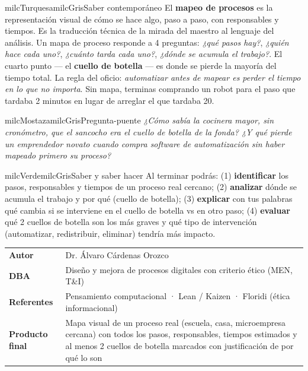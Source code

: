 \documentclass[11pt,letterpaper]{article}
\begin{document}
\begin{softbox}{milcTurquesa}{milcGris}{Saber contemporáneo}
El \textbf{mapeo de procesos} es la representación visual de cómo se hace algo, paso a paso, con responsables y tiempos. Es la traducción técnica de la mirada del maestro al lenguaje del análisis. Un mapa de proceso responde a 4 preguntas: \emph{¿qué pasos hay?}, \emph{¿quién hace cada uno?}, \emph{¿cuánto tarda cada uno?}, \emph{¿dónde se acumula el trabajo?}. El cuarto punto --- el \textbf{cuello de botella} --- es donde se pierde la mayoría del tiempo total. La regla del oficio: \emph{automatizar antes de mapear es perder el tiempo en lo que no importa}. Sin mapa, terminas comprando un robot para el paso que tardaba 2 minutos en lugar de arreglar el que tardaba 20.
\end{softbox}

\begin{softbox}{milcMostaza}{milcGris}{Pregunta-puente}
\textit{¿Cómo sabía la cocinera mayor, sin cronómetro, que el sancocho era el cuello de botella de la fonda? ¿Y qué pierde un emprendedor novato cuando compra software de automatización sin haber mapeado primero su proceso?}
\end{softbox}

\begin{softbox}{milcVerde}{milcGris}{Saber y saber hacer}
Al terminar podrás: (1) \textbf{identificar} los pasos, responsables y tiempos de un proceso real cercano; (2) \textbf{analizar} dónde se acumula el trabajo y por qué (cuello de botella); (3) \textbf{explicar} con tus palabras qué cambia si se interviene en el cuello de botella vs en otro paso; (4) \textbf{evaluar} qué 2 cuellos de botella son los más graves y qué tipo de intervención (automatizar, redistribuir, eliminar) tendría más impacto.
\end{softbox}



\small
\begin{tabularx}{\textwidth}{>{\bfseries}p{3.0cm}Y}
Autor & Dr. Álvaro Cárdenas Orozco\\
DBA & Diseño y mejora de procesos digitales con criterio ético (MEN, T\&I)\\
Referentes & Pensamiento computacional · Lean / Kaizen · Floridi (ética informacional)\\
Producto final & Mapa visual de un proceso real (escuela, casa, microempresa cercana) con todos los pasos, responsables, tiempos estimados y al menos 2 cuellos de botella marcados con justificación de por qué lo son\\
\end{tabularx}
\normalsize
\end{document}
